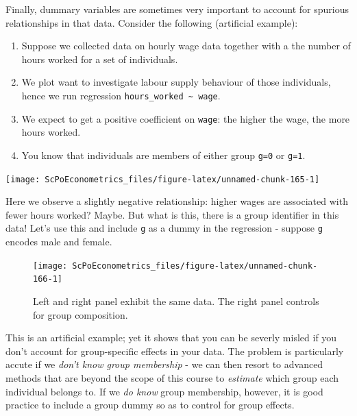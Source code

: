 \documentclass[]{book}
\providecommand{\tightlist}{%
  \setlength{\itemsep}{0pt}\setlength{\parskip}{0pt}}
\begin{document}
Finally, dummary variables are sometimes very important to account for
spurious relationships in that data. Consider the following (artificial
example):

\begin{enumerate}
\def\labelenumi{\arabic{enumi}.}
\tightlist
\item
  Suppose we collected data on hourly wage data together with a the
  number of hours worked for a set of individuals.
\item
  We plot want to investigate labour supply behaviour of those
  individuals, hence we run regression
  \texttt{hours\_worked\ \textasciitilde{}\ wage}.
\item
  We expect to get a positive coefficient on \texttt{wage}: the higher
  the wage, the more hours worked.
\item
  You know that individuals are members of either group \texttt{g=0} or
  \texttt{g=1}.
\end{enumerate}

\begin{center}\texttt{[image: ScPoEconometrics\_files/figure-latex/unnamed-chunk-165-1]} \end{center}

Here we observe a slightly negative relationship: higher wages are
associated with fewer hours worked? Maybe. But what is this, there is a
group identifier in this data! Let's use this and include \texttt{g} as
a dummy in the regression - suppose \texttt{g} encodes male and female.

\begin{figure}

{\centering \texttt{[image: ScPoEconometrics\_files/figure-latex/unnamed-chunk-166-1]} 

}

\caption{Left and right panel exhibit the same data. The right panel controls for group composition.}\label{fig:unnamed-chunk-166}
\end{figure}

This is an artificial example; yet it shows that you can be severly
misled if you don't account for group-specific effects in your data. The
problem is particularly accute if we \emph{don't know group membership}
- we can then resort to advanced methods that are beyond the scope of
this course to \emph{estimate} which group each individual belongs to.
If we \emph{do know} group membership, however, it is good practice to
include a group dummy so as to control for group effects.
\end{document}
